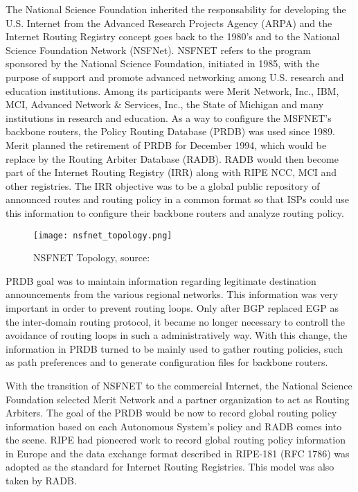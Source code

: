 \documentclass[11pt,a4paper]{scrreprt}
\begin{document}
The National Science Foundation inherited the responsability for developing the U.S. Internet from the Advanced Research Projects Agency (ARPA) and the Internet Routing Registry concept goes back to the 1980's and to the National Science Foundation Network (NSFNet).  NSFNET refers to the program sponsored by the National Science Foundation, initiated in 1985, with the purpose of support and promote advanced networking among U.S. research and education institutions. Among its participants were Merit Network, Inc., IBM, MCI, Advanced Network \& Services, Inc., the State of Michigan and many institutions in research and education. As a way to configure the MSFNET's backbone routers, the Policy Routing Database (PRDB) was used since 1989. Merit planned the retirement of PRDB for December 1994, which would be replace by the Routing Arbiter Database (RADB). RADB would then become part of the Internet Routing Registry (IRR) along with RIPE NCC, MCI and other registries. The IRR objective was to be a global public repository of announced routes and routing policy in a common format so that ISPs could use this information to configure their backbone routers and analyze routing policy.

\begin{figure}[!h]
\centering
\texttt{[image: nsfnet\_topology.png]}
\caption{NSFNET Topology, source: \cite{NSFNET_Topology}}
\label{fig:nfsnet_image}
\end{figure}


PRDB goal was to maintain information regarding legitimate destination announcements from the various regional networks. This information was very important in order to prevent routing loops. Only after BGP replaced EGP as the inter-domain routing protocol, it became no longer necessary to controll the avoidance of routing loops in such a administratively way. With this change, the information in PRDB turned to be mainly used to gather routing policies, such as path preferences and to generate configuration files for backbone routers.

With the transition of NSFNET to the commercial Internet, the National Science Foundation selected Merit Network and a partner organization to act as Routing Arbiters. The goal of the PRDB would be now to record global routing policy information based on each Autonomous System's policy and RADB comes into the scene. RIPE had pioneered work to record global routing policy information in Europe and the data exchange format described in RIPE-181 (RFC 1786) was adopted as the standard for Internet Routing Registries. This model was also taken by RADB. 
\end{document}
